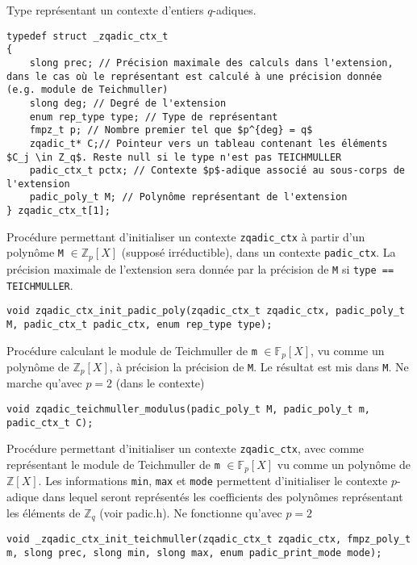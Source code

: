 \documentclass[11pt]{article}
\begin{document}
Type représentant un contexte d'entiers $q$-adiques.
\begin{verbatim}
typedef struct _zqadic_ctx_t
{
    slong prec; // Précision maximale des calculs dans l'extension, dans le cas où le représentant est calculé à une précision donnée (e.g. module de Teichmuller)
    slong deg; // Degré de l'extension
    enum rep_type type; // Type de représentant
    fmpz_t p; // Nombre premier tel que $p^{deg} = q$
    zqadic_t* C;// Pointeur vers un tableau contenant les éléments $C_j \in Z_q$. Reste null si le type n'est pas TEICHMULLER
    padic_ctx_t pctx; // Contexte $p$-adique associé au sous-corps de l'extension
    padic_poly_t M; // Polynôme représentant de l'extension
} zqadic_ctx_t[1];
\end{verbatim}

Procédure permettant d'initialiser un contexte \texttt{zqadic_ctx} à partir d'un polynôme \texttt{M} $\in \mathbb{Z}_p[X]$ (supposé irréductible), dans un contexte \texttt{padic_ctx}. La précision maximale de l'extension sera donnée par la précision de \texttt{M} si \texttt{type == TEICHMULLER}.
\begin{verbatim}
void zqadic_ctx_init_padic_poly(zqadic_ctx_t zqadic_ctx, padic_poly_t M, padic_ctx_t padic_ctx, enum rep_type type);
\end{verbatim}

Procédure calculant le module de Teichmuller de \texttt{m} $\in \mathbb{F}_p[X]$, vu comme un polynôme de $\mathbb{Z}_p[X]$, à précision la précision de \texttt{M}. Le résultat est mis dans \texttt{M}. Ne marche qu'avec $p = 2$ (dans le contexte)
\begin{verbatim}
void zqadic_teichmuller_modulus(padic_poly_t M, padic_poly_t m, padic_ctx_t C);
\end{verbatim}

Procédure permettant d'initialiser un contexte \texttt{zqadic_ctx}, avec comme représentant le module de Teichmuller de \texttt{m} $\in \mathbb{F}_p[X]$ vu comme un polynôme de $\mathbb{Z}[X]$. Les informations \texttt{min}, \texttt{max} et \texttt{mode} permettent d'initialiser le contexte $p$-adique dans lequel seront représentés les coefficients des polynômes représentant les éléments de $\mathbb{Z}_q$ (voir padic.h). Ne fonctionne qu'avec $p = 2$ 
\begin{verbatim}
void _zqadic_ctx_init_teichmuller(zqadic_ctx_t zqadic_ctx, fmpz_poly_t m, slong prec, slong min, slong max, enum padic_print_mode mode);
\end{verbatim}
\end{document}
